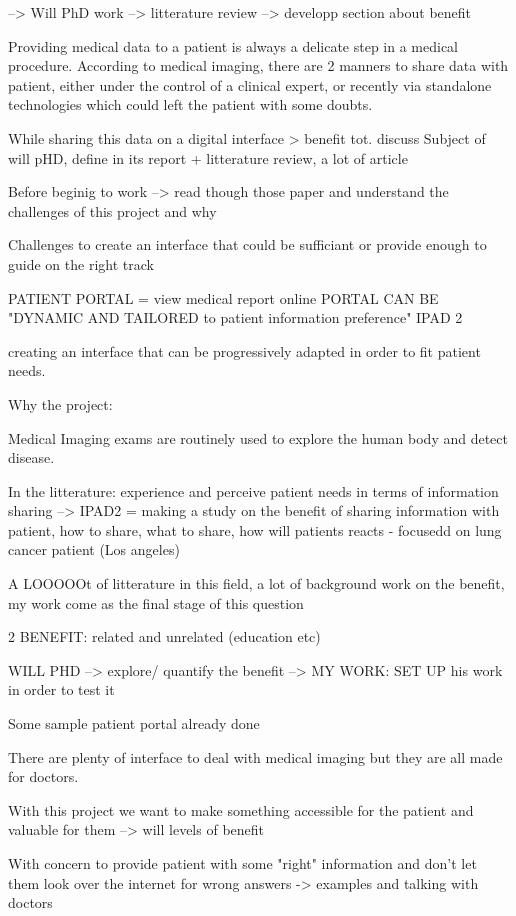 --> Will PhD work 
\newline
--> litterature review
\newline
--> developp section about benefit



Providing medical data to a patient is always a delicate step in a medical procedure. According to medical imaging, there are 2 manners to share data with patient, either under the control of a clinical expert, or recently via standalone technologies which could left the patient with some doubts.  

While sharing this data on a digital interface > benefit tot. discuss
Subject of will pHD, define in its report + litterature review, a lot of article 

Before beginig to work --> read though those paper and understand the challenges of this project and why 


Challenges to create an interface that could be sufficiant or provide enough to guide on the right track



PATIENT PORTAL = view medical report online 
PORTAL CAN BE "DYNAMIC AND TAILORED to patient information preference"  IPAD 2

creating an interface that can be progressively adapted in order to fit patient needs.

Why the project: 

Medical Imaging exams are routinely used to explore the human body and detect disease. 

In the litterature: experience and perceive patient needs in terms of information sharing 
--> IPAD2 = making a study on the benefit of sharing information with patient, how to share, what to share, how will patients reacts - focusedd on lung cancer patient (Los angeles)

A LOOOOOt of litterature in this field, a lot of background work on the benefit, my work come as the final stage of this question

2 BENEFIT: related and unrelated (education etc)

WILL PHD --> explore/ quantify the benefit --> MY WORK: SET UP his work in order to test it 

Some sample patient portal already done 

There are plenty of interface to deal with medical imaging but they are all made for doctors. 


With this project we want to make something accessible for the patient and valuable for them --> will levels of benefit 


With concern to provide patient with some "right" information and don't let them look over the internet for wrong answers
-> examples and talking with doctors

